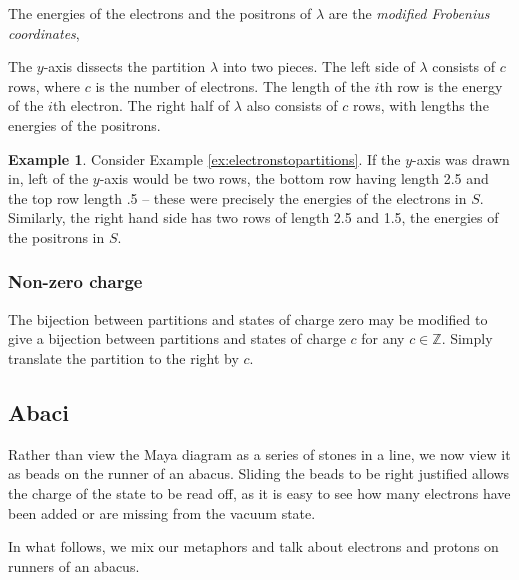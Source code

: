 \documentclass{amsart}[12pt]
\theoremstyle{definition}
\newtheorem{example}[dummy]{Example}
\newcommand{\Z}{\mathbb{Z}}
\begin{document}
The energies of the electrons and the positrons of $\lambda$ are
the \emph{modified Frobenius coordinates},

The $y$-axis dissects the partition $\lambda$ into two pieces.  The left side of $\lambda$ consists of $c$ rows, where $c$ is the number
of electrons.  The length of the $i$th row is the energy of
the $i$th electron.  The right half of $\lambda$ also consists of $c$ rows, with lengths the energies of the positrons.  



\begin{example} Consider Example \ref{ex:electronstopartitions}.  If the $y$-axis was drawn in, left of the $y$-axis would be two rows, the bottom row having length 2.5 and the top row length .5 -- these were precisely the energies of the electrons in $S$.  Similarly, the right hand side has two rows of length 2.5 and 1.5, the energies of the positrons in $S$.


\end{example}

\subsubsection{Non-zero charge}

The bijection between partitions and states of charge zero may be
modified to give a bijection between partitions and states of charge $c$ for any $c\in\Z$.   Simply translate the partition to the right by $c$.



\subsection{Abaci}

Rather than view the Maya diagram as a series of stones in a line, we
now view it as beads on the runner of an abacus.  Sliding the beads
to be right justified allows the charge of the state to be read off,
as it is easy to see how many electrons have been added or are missing
from the vacuum state.

In what follows, we mix our metaphors and talk about electrons and protons on runners of an abacus.
\end{document}
